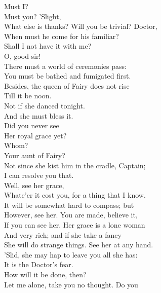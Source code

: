 \documentclass[a4paper,oneside,12pt]{memoir}
\begin{document}
\begin{drama*}
\dapperspeaks {} Must I?\\
\facespeaks {} Must you? 'Slight,\\
What else is thanks? Will you be trivial? Doctor,\\
When must he come for his familiar?\\
\dapperspeaks Shall I not have it with me?\\
\subtlespeaks {} O, good sir!\\
There must a world of ceremonies pass:\\
You must be bathed and fumigated first.\\
Besides, the queen of Fairy does not rise\\
Till it be noon.\\
\facespeaks {} Not if she danced tonight.\\
\subtlespeaks And she must bless it.\\
\facespeaks {} Did you never see\\
Her royal grace yet?\\
\dapperspeaks {} Whom?\\
\facespeaks {} Your aunt of Fairy?\\
\subtlespeaks Not since she kist him in the cradle, Captain;\\
I can resolve you that.\\
\facespeaks {} Well, see her grace,\\
Whate'er it cost you, for a thing that I know.\\
It will be somewhat hard to compass; but\\
However, see her. You are made, believe it,\\
If you can see her. Her grace is a lone woman\\
And very rich; and if she take a fancy\\
She will do strange things. See her at any hand.\\
'Slid, she may hap to leave you all she has:\\
It is the Doctor's fear.\\
\dapperspeaks {} How will it be done, then?\\
\facespeaks Let me alone, take you no thought. Do you\\

\end{drama*}
\end{document}
